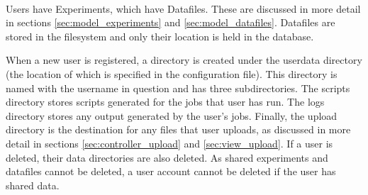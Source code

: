 \paragraph{}
Users have Experiments, which have Datafiles. These are discussed in more detail in sections  \ref{sec:model_experiments} and  \ref{sec:model_datafiles}. Datafiles are stored in the filesystem and only their location is held in the database. 

When a new user is registered, a directory is created under the userdata directory (the location of which is specified in the configuration file). This directory is named with the username in question and has three subdirectories. The scripts directory stores scripts generated for the jobs that user has run. The logs directory stores any output generated by the user's jobs. Finally, the upload directory is the destination for any files that user uploads, as discussed in more detail in sections \ref{sec:controller_upload} and \ref{sec:view_upload}. If a user is deleted, their data directories are also deleted. As shared experiments and datafiles cannot be deleted, a user account cannot be deleted if the user has shared data.

